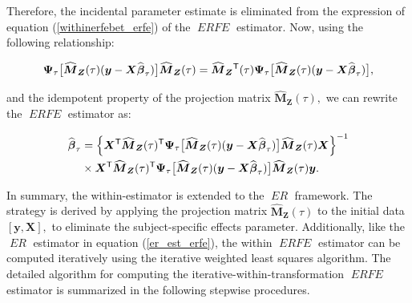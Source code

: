 \documentclass[15pt,a4paper]{article}
\newcommand{\transpose}{{}^{\text{\sffamily T}}}
\DeclareMathOperator{\ERFE}{\textit{ERFE}}
\DeclareMathOperator{\ER}{\textit{ER}}
\begin{document}
Therefore, the incidental parameter estimate is eliminated from the expression of equation (\ref{withinerfebet_erfe}) of the $\ERFE$ estimator.
Now, using the following relationship:

\begin{equation*}
 \boldsymbol{\Psi}_{\tau}\big[\widehat{\boldsymbol{M}}_{\boldsymbol{Z}}(\tau)(\boldsymbol{y}-\boldsymbol{X}\widehat{\boldsymbol{\beta}}_{\tau})\big]\widehat{\boldsymbol{M}}_{\boldsymbol{Z}}(\tau)=\widehat{\boldsymbol{M}}_{\boldsymbol{Z}}\transpose(\tau)
 \boldsymbol{\Psi}_{\tau}\big[\widehat{\boldsymbol{M}}_{\boldsymbol{Z}}(\tau)(\boldsymbol{y}-\boldsymbol{X}\widehat{\boldsymbol{\beta}}_{\tau})\big],
\end{equation*}

and the idempotent property of the projection matrix \(\widehat{\boldsymbol{M}}_{\boldsymbol{Z}}(\tau),\) we can rewrite the $\ERFE$ estimator as:

\begin{equation}\label{withinerfebet1_erfe}
\begin{split}
  \widehat{\boldsymbol{\beta}}_{\tau} 
  & = \Big\lbrace\boldsymbol{X}\transpose\widehat{\boldsymbol{M}}_{\boldsymbol{Z}}(\tau)\transpose\boldsymbol{\Psi}_{\tau}
  \big[\widehat{\boldsymbol{M}}_{\boldsymbol{Z}}(\tau)(\boldsymbol{y}-\boldsymbol{X}\widehat{\boldsymbol{\beta}}_{\tau})\big]
  \widehat{\boldsymbol{M}}_{\boldsymbol{Z}}(\tau)\boldsymbol{X}\Big\rbrace^{-1}\\
  & \times \boldsymbol{X}\transpose\widehat{\boldsymbol{M}}_{\boldsymbol{Z}}(\tau)\transpose\boldsymbol{\Psi}_{\tau}
  \big[\widehat{\boldsymbol{M}}_{\boldsymbol{Z}}(\tau)(\boldsymbol{y}-\boldsymbol{X}\widehat{\boldsymbol{\beta}}_{\tau})\big]
  \widehat{\boldsymbol{M}}_{\boldsymbol{Z}}(\tau)\boldsymbol{y}.
\end{split}
\end{equation}

In summary, the within-estimator  is extended to the $\ER$ framework. The strategy is derived by applying the projection matrix \(\widehat{\boldsymbol{M}}_{\boldsymbol{Z}}(\tau)\) to the initial data \([\boldsymbol{y},\boldsymbol{X}],\) to eliminate the subject-specific effects parameter. Additionally, like the $\ER$ estimator in equation (\ref{er_est_erfe}), the within $\ERFE$ estimator can be computed iteratively using the iterative weighted least squares algorithm. The detailed algorithm for computing the iterative-within-transformation $\ERFE$ estimator is summarized in the following stepwise procedures.
\end{document}
